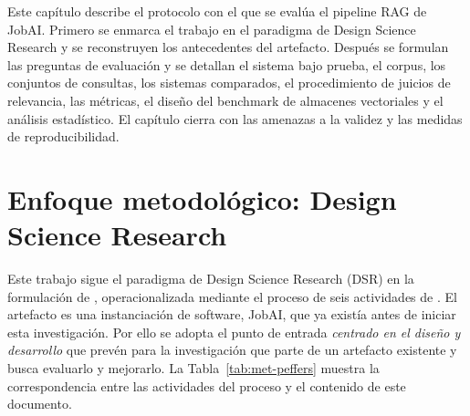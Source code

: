 Este capítulo describe el protocolo con el que se evalúa el pipeline RAG de JobAI. Primero se enmarca el trabajo en el paradigma de Design Science Research y se reconstruyen los antecedentes del artefacto. Después se formulan las preguntas de evaluación y se detallan el sistema bajo prueba, el corpus, los conjuntos de consultas, los sistemas comparados, el procedimiento de juicios de relevancia, las métricas, el diseño del benchmark de almacenes vectoriales y el análisis estadístico. El capítulo cierra con las amenazas a la validez y las medidas de reproducibilidad.

\section{Enfoque metodológico: Design Science Research}
\label{sec:met-dsr}

Este trabajo sigue el paradigma de Design Science Research (DSR) en la formulación de \citet{Hevner2004}, operacionalizada mediante el proceso de seis actividades de \citet{Peffers2007}. El artefacto es una instanciación de software, JobAI, que ya existía antes de iniciar esta investigación. Por ello se adopta el punto de entrada \emph{centrado en el diseño y desarrollo} que \citet{Peffers2007} prevén para la investigación que parte de un artefacto existente y busca evaluarlo y mejorarlo. La Tabla~\ref{tab:met-peffers} muestra la correspondencia entre las actividades del proceso y el contenido de este documento.

